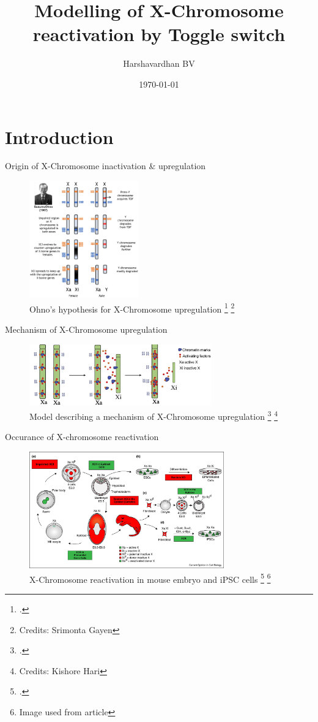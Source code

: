 \documentclass[aspectratio=169,9pt]{beamer}
\title{Modelling of X-Chromosome reactivation by Toggle switch}
\author{Harshavardhan BV}
\date{\today}
\institute{IISc Bangalore}
\begin{document}
    \frame{\titlepage}

    \section{Introduction}
    \begin{frame}{Origin of X-Chromosome inactivation \& upregulation}
        \begin{figure}
            \centering
            \includegraphics[width=0.42\textwidth]{ohno}
            \caption{Ohno's hypothesis for X-Chromosome upregulation \footcite{ohno} \footnote{Credits: Srimonta Gayen}}
        \end{figure}
    \end{frame}

    \begin{frame}{Mechanism of X-Chromosome upregulation}
        \begin{figure}
            \centering
            \includegraphics[width=0.7\textwidth]{xcu}
            \caption{Model describing a mechanism of X-Chromosome upregulation \footcite{XCI} \footnote{Credits: Kishore Hari}}
        \end{figure}
    \end{frame}

    \begin{frame}{Occurance of X-chromosome reactivation}
        \begin{figure}
            \centering
            \includegraphics[width=0.75\textwidth]{xcr}
            \caption{X-Chromosome reactivation in mouse embryo and iPSC cells \footcite{XCR} \footnote{Image used from article}}
        \end{figure}
    \end{frame}
\end{document}
